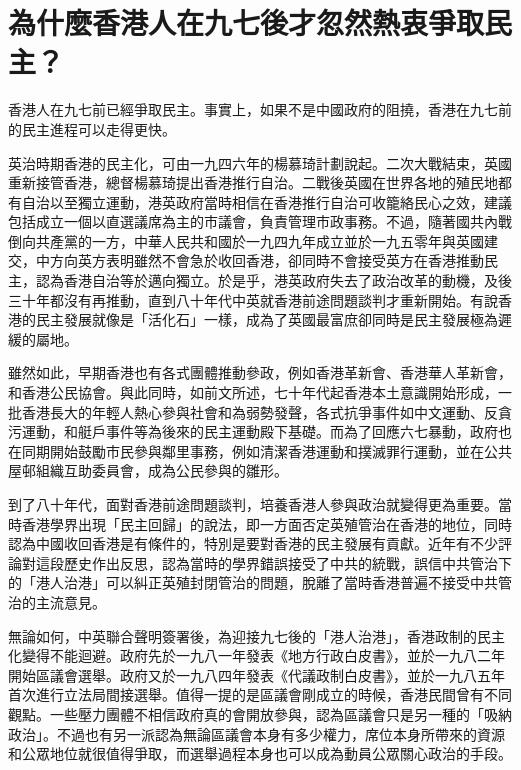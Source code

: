 \section{為什麼香港人在九七後才忽然熱衷爭取民主？}
\label{sec:sec32}

香港人在九七前已經爭取民主。事實上，如果不是中國政府的阻撓，香港在九七前的民主進程可以走得更快。

英治時期香港的民主化，可由一九四六年的楊慕琦計劃說起。二次大戰結束，英國重新接管香港，總督楊慕琦提出香港推行自治。二戰後英國在世界各地的殖民地都有自治以至獨立運動，港英政府當時相信在香港推行自治可收籠絡民心之效，建議包括成立一個以直選議席為主的市議會，負責管理市政事務。不過，隨著國共內戰倒向共產黨的一方，中華人民共和國於一九四九年成立並於一九五零年與英國建交，中方向英方表明雖然不會急於收回香港，卻同時不會接受英方在香港推動民主，認為香港自治等於邁向獨立。於是乎，港英政府失去了政治改革的動機，及後三十年都沒有再推動，直到八十年代中英就香港前途問題談判才重新開始。有說香港的民主發展就像是「活化石」一樣，成為了英國最富庶卻同時是民主發展極為遲緩的屬地。

雖然如此，早期香港也有各式團體推動參政，例如香港革新會、香港華人革新會，和香港公民協會。與此同時，如前文所述，七十年代起香港本土意識開始形成，一批香港長大的年輕人熱心參與社會和為弱勢發聲，各式抗爭事件如中文運動、反貪污運動，和艇戶事件等為後來的民主運動殿下基礎。而為了回應六七暴動，政府也在同期開始鼓勵市民參與鄰里事務，例如清潔香港運動和撲滅罪行運動，並在公共屋邨組織互助委員會，成為公民參與的雛形。

到了八十年代，面對香港前途問題談判，培養香港人參與政治就變得更為重要。當時香港學界出現「民主回歸」的說法，即一方面否定英殖管治在香港的地位，同時認為中國收回香港是有條件的，特別是要對香港的民主發展有貢獻。近年有不少評論對這段歷史作出反思，認為當時的學界錯誤接受了中共的統戰，誤信中共管治下的「港人治港」可以糾正英殖封閉管治的問題，脫離了當時香港普遍不接受中共管治的主流意見。

無論如何，中英聯合聲明簽署後，為迎接九七後的「港人治港」，香港政制的民主化變得不能迴避。政府先於一九八一年發表《地方行政白皮書》，並於一九八二年開始區議會選舉。政府又於一九八四年發表《代議政制白皮書》，並於一九八五年首次進行立法局間接選舉。值得一提的是區議會剛成立的時候，香港民間曾有不同觀點。一些壓力團體不相信政府真的會開放參與，認為區議會只是另一種的「吸納政治」。不過也有另一派認為無論區議會本身有多少權力，席位本身所帶來的資源和公眾地位就很值得爭取，而選舉過程本身也可以成為動員公眾關心政治的手段。


